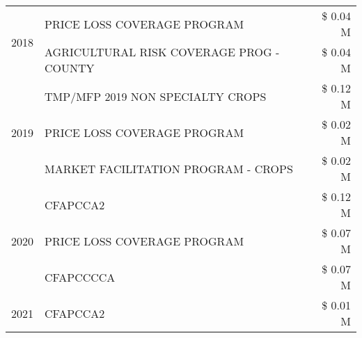 \begin{tabular}{llr}
\cline{1-3}
\multirow[t]{2}{*}{2018} & PRICE LOSS COVERAGE PROGRAM & \$ 0.04 M \\
 & AGRICULTURAL RISK COVERAGE PROG - COUNTY & \$ 0.04 M \\
\cline{1-3}
\multirow[t]{3}{*}{2019} & TMP/MFP 2019 NON SPECIALTY CROPS & \$ 0.12 M \\
 & PRICE LOSS COVERAGE PROGRAM & \$ 0.02 M \\
 & MARKET FACILITATION PROGRAM - CROPS & \$ 0.02 M \\
\cline{1-3}
\multirow[t]{3}{*}{2020} & CFAPCCA2 & \$ 0.12 M \\
 & PRICE LOSS COVERAGE PROGRAM & \$ 0.07 M \\
 & CFAPCCCCA & \$ 0.07 M \\
\cline{1-3}
2021 & CFAPCCA2 & \$ 0.01 M \\
\cline{1-3}
\bottomrule
\end{tabular}

